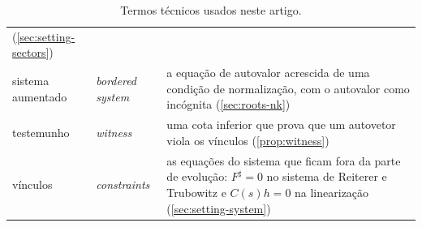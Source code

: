 \begin{table}[tbp]
\begin{tabular}{@{}>{\raggedright\arraybackslash}p{}>{\raggedright\arraybackslash}p{}
  >{\raggedright\arraybackslash}p{}@{}}
  (\cref{sec:setting-sectors}) \\
sistema aumentado & \emph{bordered system} & a equação de autovalor acrescida de uma condição de normalização, com o
  autovalor como incógnita (\cref{sec:roots-nk}) \\
testemunho & \emph{witness} & uma cota inferior que prova que um autovetor viola os vínculos (\cref{prop:witness}) \\
vínculos & \emph{constraints} & as equações do sistema que ficam fora da parte de evolução: $F^\sharp=0$ no sistema de
  Reiterer e Trubowitz e $C(s)h=0$ na linearização (\cref{sec:setting-system}) \\
\bottomrule
\end{tabular}
\caption{Termos técnicos usados neste artigo.}
\label{tab:termos}
\end{table}
